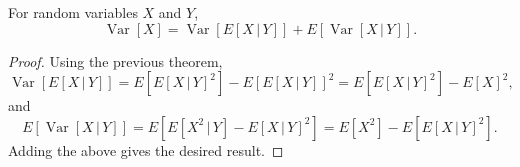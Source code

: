 \documentclass[11pt]{article}
\newcommand\E[1]{E\left[#1\right]}
\newcommand\var[1]{\operatorname{Var}[#1]}
\theoremstyle{definition}
\theoremstyle{remark}
\numberwithin{equation}{module}
\begin{document}
    \begin{theorem}
        For random variables $X$ and $Y$, \[
            \var{X} = \var{\E{X\,|\,Y}} + \E{\var{X\,|\,Y}}.
        \] 
    \end{theorem}
    \begin{proof}
        Using the previous theorem, \[
            \var{\E{X\,|\,Y}} = \E{\E{X\,|\,Y}^2} - \E{\E{X\,|\,Y}}^2 =
            \E{\E{X\,|\,Y}^2} - \E{X}^2,
        \] and \[
            \E{\var{X\,|\,Y}} = \E{\E{X^2\,|\,Y} - \E{X\,|\,Y}^2} =
            \E{X^2} - \E{\E{X\,|\,Y}^2}.
        \] Adding the above gives the desired result.
    \end{proof}
    
\end{document}

